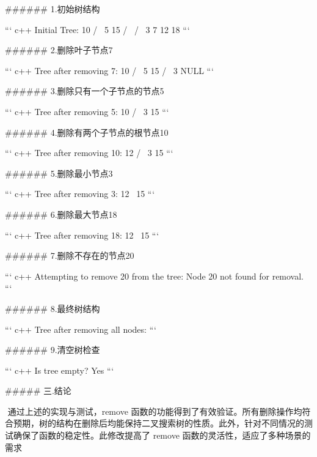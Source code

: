 ###### 1.初始树结构

``` c++
Initial Tree:
        10
       /  \
      5    15
     / \   / \
    3   7 12  18
```

###### 2.删除叶子节点7

``` c++
Tree after removing 7:
        10
       /  \
      5    15
     / \
    3   NULL
```

###### 3.删除只有一个子节点的节点5

``` c++
Tree after removing 5:
        10
       /  \
      3    15
```

###### 4.删除有两个子节点的根节点10

``` c++
Tree after removing 10:
        12
       /  \
      3    15
```

###### 5.删除最小节点3

``` c++
Tree after removing 3:
        12
          \
          15
```

###### 6.删除最大节点18

``` c++
Tree after removing 18:
        12
          \
          15
```

###### 7.删除不存在的节点20

``` c++
Attempting to remove 20 from the tree:
Node 20 not found for removal.
```

###### 8.最终树结构

``` c++
Tree after removing all nodes:
```

###### 9.清空树检查

``` c++
Is tree empty? Yes
```



#####  三.结论

​        通过上述的实现与测试，remove 函数的功能得到了有效验证。所有删除操作均符合预期，树的结构在删除后均能保持二叉搜索树的性质。此外，针对不同情况的测试确保了函数的稳定性。此修改提高了 remove 函数的灵活性，适应了多种场景的需求















